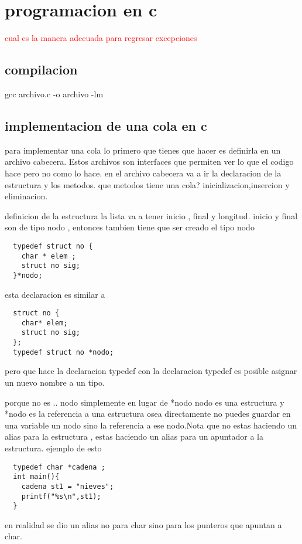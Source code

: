 \documentclass[12p]{article}
\newcommand{\rojo}[1]{
  \textcolor{red}{#1}
  }
\begin{document}
\section{programacion en c}
\rojo{cual es la manera adecuada para regresar excepciones}

\subsection{compilacion}
gcc archivo.c -o archivo -lm 

\subsection{implementacion de una cola en c}
para implementar una cola lo primero que tienes que hacer es definirla en un archivo cabecera. Estos archivos son interfaces
que permiten ver lo que el codigo hace pero no como lo hace.
en el archivo cabecera va a ir la declaracion de la estructura y los metodos.
que metodos tiene una cola?
inicializacion,insercion y eliminacion.

definicion de la estructura
la lista va a tener inicio , final y longitud. inicio y final son de tipo nodo , entonces tambien tiene que ser creado el tipo nodo
\begin{lstlisting}
  typedef struct no {
    char * elem ;
    struct no sig;
  }*nodo;
\end{lstlisting}
esta declaracion es similar a 
\begin{lstlisting}
  struct no {
    char* elem;
    struct no sig;
  };
  typedef struct no *nodo;
\end{lstlisting}

pero que hace la declaracion typedef
con la declaracion typedef es posible asignar un nuevo nombre a un tipo.

porque no es .. nodo simplemente en lugar de *nodo
nodo es una estructura y *nodo es la referencia a una estructura osea directamente no puedes guardar en una variable
un nodo sino la referencia a ese nodo.Nota que no estas haciendo un alias para la estructura , estas haciendo un alias para
un apuntador a la estructura.
ejemplo de esto
\begin{lstlisting}
  typedef char *cadena ;
  int main(){
    cadena st1 = "nieves";
    printf("%s\n",st1);
  }
\end{lstlisting}
en realidad se dio un alias no para char sino para los punteros que apuntan a char.
\end{document}

